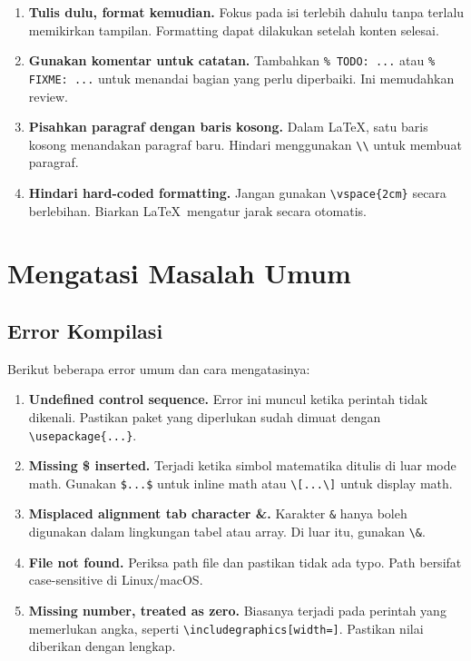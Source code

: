 \begin{enumerate}
  \item \textbf{Tulis dulu, format kemudian.} Fokus pada isi terlebih dahulu tanpa terlalu memikirkan tampilan. Formatting dapat dilakukan setelah konten selesai.

  \item \textbf{Gunakan komentar untuk catatan.} Tambahkan \verb|% TODO: ...| atau \verb|% FIXME: ...| untuk menandai bagian yang perlu diperbaiki. Ini memudahkan review.

  \item \textbf{Pisahkan paragraf dengan baris kosong.} Dalam \LaTeX, satu baris kosong menandakan paragraf baru. Hindari menggunakan \verb|\\| untuk membuat paragraf.

  \item \textbf{Hindari hard-coded formatting.} Jangan gunakan \verb|\vspace{2cm}| secara berlebihan. Biarkan \LaTeX\ mengatur jarak secara otomatis.
\end{enumerate}

\section{Mengatasi Masalah Umum}

\subsection{Error Kompilasi}

Berikut beberapa error umum dan cara mengatasinya:

\begin{enumerate}
  \item \textbf{Undefined control sequence.} Error ini muncul ketika perintah tidak dikenali. Pastikan paket yang diperlukan sudah dimuat dengan \verb|\usepackage{...}|.

  \item \textbf{Missing \$ inserted.} Terjadi ketika simbol matematika ditulis di luar mode math. Gunakan \verb|$...$| untuk inline math atau \verb|\[...\]| untuk display math.

  \item \textbf{Misplaced alignment tab character \&.} Karakter \verb|&| hanya boleh digunakan dalam lingkungan tabel atau array. Di luar itu, gunakan \verb|\&|.

  \item \textbf{File not found.} Periksa path file dan pastikan tidak ada typo. Path bersifat case-sensitive di Linux/macOS.

  \item \textbf{Missing number, treated as zero.} Biasanya terjadi pada perintah yang memerlukan angka, seperti \verb|\includegraphics[width=]|. Pastikan nilai diberikan dengan lengkap.
\end{enumerate}

